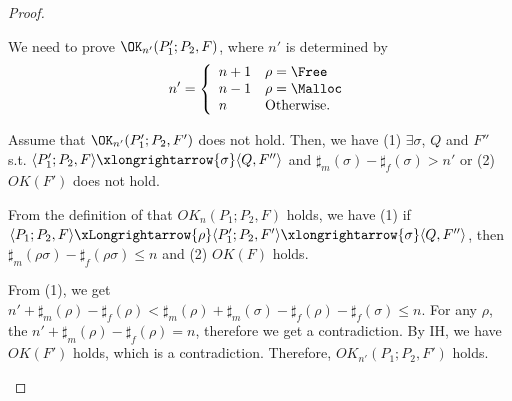 \begin{proof}
\begin{itemize}
  We need to prove \(\OK_{n'}(P_1';P_2, F) \), where \(n'\) is
  determined by 
  \[
   n'=\left\{
   \begin{array}{ll}
     n + 1 & \rho = \Free\\
     n - 1 & \rho = \Malloc\\
     n & \mbox{Otherwise.}
   \end{array}
   \right.
   \]

  Assume that \(\OK_{n'}(P_1';P_2, F') \) does not hold. Then, we have
  (1) \( \exists \sigma \), \(Q\) and \(F''\) s.t. \( \langle
  P_1';P_2, F \rangle \xlongrightarrow{\sigma} \langle Q, F'' \rangle
  \) and \(\sharp_{m}(\sigma) - \sharp_{f}(\sigma) > n'\)
  or (2) \( OK(F')\) does not hold.

  From the definition of that \(OK_n(P_1;P_2, F)\) holds, we have (1)
  if \( \langle P_1;P_2, F \rangle \xLongrightarrow{\rho} \langle
  P_1';P_2, F' \rangle \xlongrightarrow{\sigma} \langle Q, F'' \rangle
  \), then \(\sharp_m(\rho\sigma) -
  \sharp_f(\rho\sigma) \le n \) and (2) \(OK(F)\) holds.

  From (1), we get \( n' + \sharp_m(\rho) - \sharp_f(\rho) <
  \sharp_m(\rho) + \sharp_m(\sigma) - \sharp_f(\rho) -
  \sharp_f(\sigma) \le n\). For any \(\rho\), the \( n' +
  \sharp_m(\rho) - \sharp_f(\rho) = n\), therefore we get a
  contradiction. By IH, we have \(OK(F')\) holds, which is a
  contradiction. Therefore, \(OK_{n'}(P_1;P_2, F')\) holds.

\end{itemize}
\end{proof}


